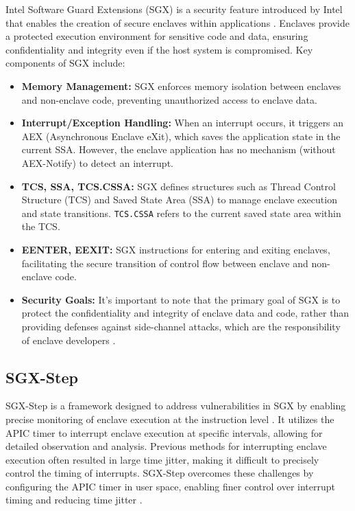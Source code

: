 \documentclass{llncs}
\begin{document}
Intel Software Guard Extensions (SGX) is a security feature introduced by Intel
that enables the creation of secure enclaves within applications \cite{CostanD16}.
Enclaves provide a protected execution environment for sensitive code and data,
ensuring confidentiality and integrity even if the host system is compromised.
Key components of SGX include:

\begin{itemize}
  \item \textbf{Memory Management:}
    SGX enforces memory isolation between enclaves and non-enclave code,
    preventing unauthorized access to enclave data.
  \item \textbf{Interrupt/Exception Handling:}
    When an interrupt occurs, it triggers an AEX (Asynchronous Enclave eXit),
    which saves the application state in the current SSA.
    However, the enclave application has no mechanism (without AEX-Notify) to detect an interrupt.
  \item \textbf{TCS, SSA, TCS.CSSA:}
    SGX defines structures such as Thread Control Structure (TCS) and Saved State Area (SSA)
    to manage enclave execution and state transitions.
    \texttt{TCS.CSSA} refers to the current saved state area within the TCS.
  \item \textbf{EENTER, EEXIT:}
    SGX instructions for entering and exiting enclaves,
    facilitating the secure transition of control flow between enclave and non-enclave code.
  \item \textbf{Security Goals:}
    It's important to note that the primary goal of SGX is to protect
    the confidentiality and integrity of enclave data and code,
    rather than providing defenses against side-channel attacks,
    which are the responsibility of enclave developers \cite{CostanD16}.
\end{itemize}

\subsection{SGX-Step}

SGX-Step is a framework designed to address vulnerabilities in SGX
by enabling precise monitoring of enclave execution at the instruction level \cite{ArnautovTGKMPLM16}.
It utilizes the APIC timer to interrupt enclave execution at specific intervals,
allowing for detailed observation and analysis.
Previous methods for interrupting enclave execution often resulted in large time jitter,
making it difficult to precisely control the timing of interrupts.
SGX-Step overcomes these challenges by configuring the APIC timer in user space,
enabling finer control over interrupt timing and reducing time jitter \cite{ArnautovTGKMPLM16}.
\end{document}
